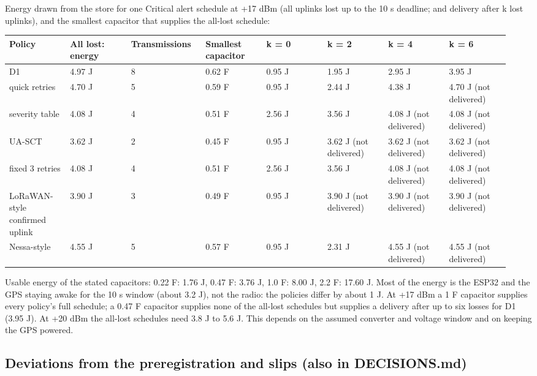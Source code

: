 Energy drawn from the store for one Critical alert schedule at +17 dBm (all uplinks lost up to the 10 s deadline; and delivery after k lost uplinks), and the smallest capacitor that supplies the all-lost schedule:

{\scriptsize\raggedright
\begin{longtable}{p{0.119\linewidth}p{0.119\linewidth}p{0.119\linewidth}p{0.119\linewidth}p{0.119\linewidth}p{0.119\linewidth}p{0.119\linewidth}p{0.119\linewidth}}
\toprule
Policy & All lost: energy & Transmissions & Smallest capacitor & k = 0 & k = 2 & k = 4 & k = 6 \\
\midrule
\endhead
D1 & 4.97 J & 8 & 0.62 F & 0.95 J & 1.95 J & 2.95 J & 3.95 J \\
quick retries & 4.70 J & 5 & 0.59 F & 0.95 J & 2.44 J & 4.38 J & 4.70 J (not delivered) \\
severity table & 4.08 J & 4 & 0.51 F & 2.56 J & 3.56 J & 4.08 J (not delivered) & 4.08 J (not delivered) \\
UA-SCT & 3.62 J & 2 & 0.45 F & 0.95 J & 3.62 J (not delivered) & 3.62 J (not delivered) & 3.62 J (not delivered) \\
fixed 3 retries & 4.08 J & 4 & 0.51 F & 2.56 J & 3.56 J & 4.08 J (not delivered) & 4.08 J (not delivered) \\
LoRaWAN-style confirmed uplink & 3.90 J & 3 & 0.49 F & 0.95 J & 3.90 J (not delivered) & 3.90 J (not delivered) & 3.90 J (not delivered) \\
Nessa-style & 4.55 J & 5 & 0.57 F & 0.95 J & 2.31 J & 4.55 J (not delivered) & 4.55 J (not delivered) \\
\bottomrule
\end{longtable}}

Usable energy of the stated capacitors: 0.22 F: 1.76 J, 0.47 F: 3.76 J, 1.0 F: 8.00 J, 2.2 F: 17.60 J. Most of the energy is the ESP32 and the GPS staying awake for the 10 s window (about 3.2 J), not the radio: the policies differ by about 1 J. At +17 dBm a 1 F capacitor supplies every policy's full schedule; a 0.47 F capacitor supplies none of the all-lost schedules but supplies a delivery after up to six losses for D1 (3.95 J). At +20 dBm the all-lost schedules need 3.8 J to 5.6 J. This depends on the assumed converter and voltage window and on keeping the GPS powered.

\subsection*{Deviations from the preregistration and slips (also in DECISIONS.md)}

